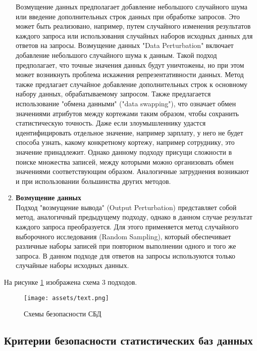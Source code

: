 \begin{enumerate}
    Возмущение данных предполагает добавление небольшого случайного шума или введение дополнительных строк данных при обработке запросов. Это может быть реализовано, например, путем случайного изменения результатов каждого запроса или использования случайных наборов исходных данных для ответов на запросы. Возмущение данных "Data Perturbation" включает добавление небольшого случайного шума к данным. Такой подход предполагает, что точные значения данных будут уничтожены, но при этом может возникнуть проблема искажения репрезентативности данных. Метод также предлагает случайное добавление дополнительных строк к основному набору данных, обрабатываемому запросом. Также предлагается использование "обмена данными" ("data swapping"), что означает обмен значениями атрибутов между кортежами таким образом, чтобы сохранить статистическую точность. Даже если злоумышленнику удастся идентифицировать отдельное значение, например зарплату, у него не будет способа узнать, какому конкретному кортежу, например сотруднику, это значение принадлежит. Однако данному подходу присущи сложности в поиске множества записей, между которыми можно организовать обмен значениями соответствующим образом. Аналогичные затруднения возникают и при использовании большинства других методов.

    \item \textbf{Возмущение данных}
    \\

    Подход "возмущение вывода" (Output Perturbation) представляет собой метод, аналогичный предыдущему подходу, однако в данном случае результат каждого запроса преобразуется. Для этого применяется метод случайного выборочного исследования (Random Sampling), который обеспечивает различные наборы записей при повторном выполнении одного и того же запроса. В данном подходе для ответов на запросы используются только случайные наборы исходных данных. 
    
\end{enumerate}

На рисунке \ref{fig:SDB_secure} изображена схема 3 подходов.
\begin{figure}[h]
\centering
\texttt{[image: assets/text.png]}
\caption{Схемы безопасности СБД}
\label{fig:SDB_secure}
\end{figure}


\subsection{Критерии безопасности статистических баз данных}

